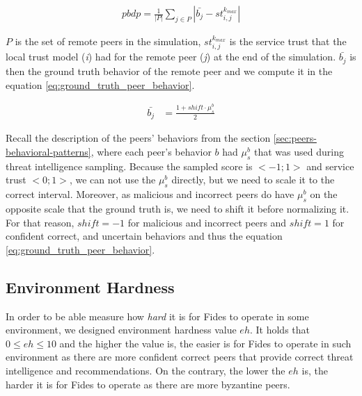 \begin{equation}
\begin{split}
    pbdp = \frac{1}{|P|} \sum_{j \in P}\left|\bar{b_{j}} - st^{k_{max}}_{i, j} \right|
\end{split}
\label{eq:peers_behavior_detection_metric}
\end{equation}

$P$ is the set of remote peers in the simulation, $st^{k_{max}}_{i, j}$ is the service trust that the local trust model (\textit{i}) had for the remote peer (\textit{j}) at the end of the simulation.
$\bar{b_{j}}$ is then the ground truth behavior of the remote peer and we compute it in the equation \ref{eq:ground_truth_peer_behavior}.

\begin{equation}
    \begin{split}
    \bar{b_{j}} &= \frac{1 + shift \cdot \mu^{b}_{s}}{2}
    \end{split}
    \label{eq:ground_truth_peer_behavior}
\end{equation}

Recall the description of the peers' behaviors from the section \ref{sec:peers-behavioral-patterns}, where each peer's behavior $b$ had $\mu^{b}_{s}$ that was used during threat intelligence sampling.
Because the sampled score is $<-1; 1>$ and service trust $<0; 1>$, we can not use the $\mu^{b}_{s}$ directly, but we need to scale it to the correct interval.
Moreover, as malicious and incorrect peers  do have $\mu^{b}_{s}$ on the opposite scale that the ground truth is, we need to shift it before normalizing it.
For that reason, $shift = -1$ for malicious and incorrect peers and $shift = 1$ for confident correct, and uncertain behaviors and thus the equation \ref{eq:ground_truth_peer_behavior}.

\subsection{Environment Hardness}
\label{subsec:environment-hardness}
In order to be able measure how \textit{hard} it is for Fides to operate in some environment, we designed environment hardness value $eh$.
It holds that $0 \leq eh \leq 10$ and the higher the value is, the easier is for Fides to operate in such environment as there are more confident correct peers that provide correct threat intelligence and recommendations.
On the contrary, the lower the $eh$ is, the harder it is for Fides to operate as there are more byzantine peers.

